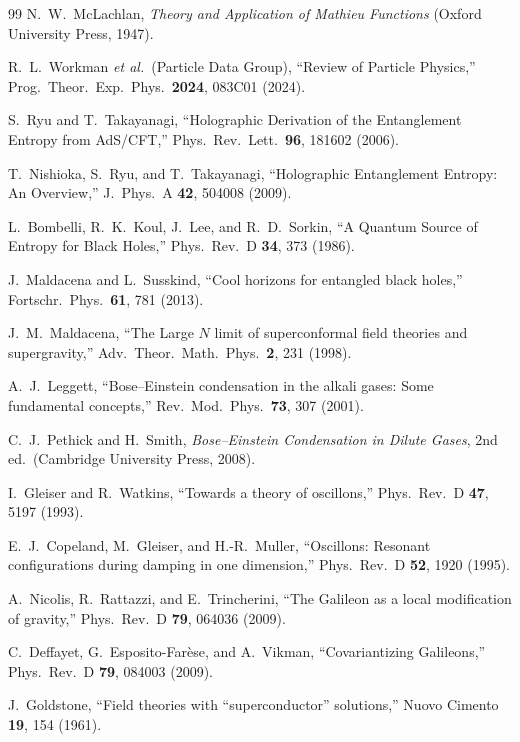 \begin{thebibliography}{99}
N.~W.~McLachlan,
\emph{Theory and Application of Mathieu Functions}
(Oxford University Press, 1947).

R.~L.~Workman \textit{et al.}\ (Particle Data Group),
``Review of Particle Physics,''
Prog.\ Theor.\ Exp.\ Phys.\ \textbf{2024}, 083C01 (2024).

S.~Ryu and T.~Takayanagi,
``Holographic Derivation of the Entanglement Entropy from AdS/CFT,''
Phys.\ Rev.\ Lett.\ \textbf{96}, 181602 (2006).

T.~Nishioka, S.~Ryu, and T.~Takayanagi,
``Holographic Entanglement Entropy: An Overview,''
J.\ Phys.\ A \textbf{42}, 504008 (2009).

L.~Bombelli, R.~K.~Koul, J.~Lee, and R.~D.~Sorkin,
``A Quantum Source of Entropy for Black Holes,''
Phys.\ Rev.\ D \textbf{34}, 373 (1986).

J.~Maldacena and L.~Susskind,
``Cool horizons for entangled black holes,''
Fortschr.\ Phys.\ \textbf{61}, 781 (2013).

J.~M.~Maldacena,
``The Large $N$ limit of superconformal field theories and supergravity,''
Adv.\ Theor.\ Math.\ Phys.\ \textbf{2}, 231 (1998).

A.~J.~Leggett,
``Bose--Einstein condensation in the alkali gases: Some fundamental concepts,''
Rev.\ Mod.\ Phys.\ \textbf{73}, 307 (2001).

C.~J.~Pethick and H.~Smith,
\emph{Bose--Einstein Condensation in Dilute Gases},
2nd ed.\ (Cambridge University Press, 2008).

I.~Gleiser and R.~Watkins,
``Towards a theory of oscillons,''
Phys.\ Rev.\ D \textbf{47}, 5197 (1993).

E.~J.~Copeland, M.~Gleiser, and H.-R.~Muller,
``Oscillons: Resonant configurations during damping in one dimension,''
Phys.\ Rev.\ D \textbf{52}, 1920 (1995).

A.~Nicolis, R.~Rattazzi, and E.~Trincherini,
``The Galileon as a local modification of gravity,''
Phys.\ Rev.\ D \textbf{79}, 064036 (2009).

C.~Deffayet, G.~Esposito-Far\`ese, and A.~Vikman,
``Covariantizing Galileons,''
Phys.\ Rev.\ D \textbf{79}, 084003 (2009).

J.~Goldstone,
``Field theories with ``superconductor'' solutions,''
Nuovo Cimento \textbf{19}, 154 (1961).


\end{thebibliography}

